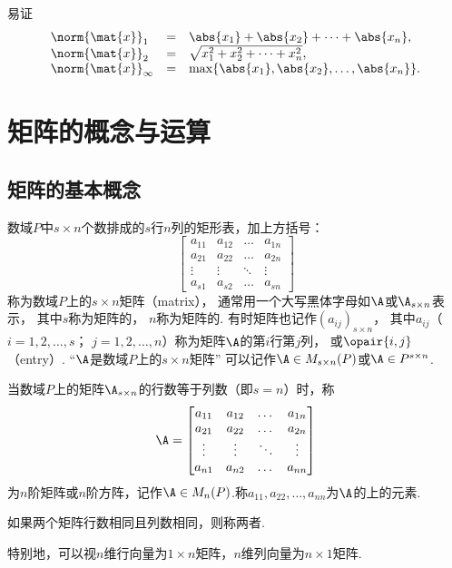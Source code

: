 易证\[
\begin{array}{lll}
\norm{\mat{x}}_1 &=& \abs{x_1} + \abs{x_2} + \dotsb + \abs{x_n}, \\
\norm{\mat{x}}_2 &=& \sqrt{x_1^2 + x_2^2 + \dotsb + x_n^2}, \\
\norm{\mat{x}}_\infty &=& \max\{\abs{x_1},\abs{x_2},\dotsc,\abs{x_n}\}.
\end{array}
\]

\section{矩阵的概念与运算}
\subsection{矩阵的基本概念}
\begin{definition}[矩阵]
数域\(P\)中\(s \times n\)个数排成的\(s\)行\(n\)列的矩形表，加上方括号：\[
	\begin{bmatrix}
		a_{11} & a_{12} & \dots & a_{1n} \\
		a_{21} & a_{22} & \dots & a_{2n} \\
		\vdots & \vdots & \ddots & \vdots \\
		a_{s1} & a_{s2} & \dots & a_{sn}
	\end{bmatrix}
\]称为数域\(P\)上的\(s \times n\)矩阵（matrix），
通常用一个大写黑体字母如\(\A\)或\(\A_{s \times n}\)表示，
其中\(s\)称为矩阵的，
\(n\)称为矩阵的.
有时矩阵也记作\((a_{ij})_{s \times n}\)，
其中\(a_{ij}\)（\(i=1,2,\dotsc,s\)；
\(j=1,2,\dotsc,n\)）称为矩阵\(\A\)的第\(i\)行第\(j\)列，
或\(\opair{i,j}\) （entry）.
“\(\A\)是数域\(P\)上的\(s \times n\)矩阵”%
可以记作\(\A \in M_{s \times n}(P)\)或\(\A \in P^{s \times n}\).

当数域\(P\)上的矩阵\(\A_{s \times n}\)的行数等于列数（即\(s=n\)）时，称\[
\A = \begin{bmatrix}
a_{11} & a_{12} & \dots & a_{1n} \\
a_{21} & a_{22} & \dots & a_{2n} \\
\vdots & \vdots & \ddots & \vdots \\
a_{n1} & a_{n2} & \dots & a_{nn}
\end{bmatrix}
\]为\(n\)阶矩阵或\(n\)阶方阵，记作\(\A \in M_n(P)\).称\(a_{11},a_{22},\dotsc,a_{nn}\)为\(\A\)的上的元素.

如果两个矩阵行数相同且列数相同，则称两者.

特别地，可以视\(n\)维行向量为\(1 \times n\)矩阵，\(n\)维列向量为\(n \times 1\)矩阵.
\end{definition}

